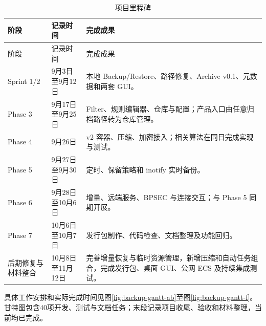 \begin{longtable}{L{.22\linewidth}L{.23\linewidth}L{.44\linewidth}}
\caption{项目里程碑}\label{tab:milestones}\\\toprule 阶段 & 记录时间 & 完成成果\\\midrule\endfirsthead
\toprule 阶段 & 记录时间 & 完成成果\\\midrule\endhead
Sprint 1/2 & 9月3日至9月12日 & 本地 Backup/Restore、路径修复、Archive v0.1、元数据和两套 GUI。\\
Phase 3 & 9月17日至9月25日 & Filter、规则编辑器、仓库与配置；产品入口由任意归档路径转为仓库管理。\\
Phase 4 & 9月26日 & v2 容器、压缩、加密接入；相关算法在同日完成实现与测试。\\
Phase 5 & 9月27日至9月30日 & 定时、保留策略和 inotify 实时备份。\\
Phase 6 & 9月28日至10月6日 & 增量、远端服务、BPSEC 与连接交互；与 Phase 5 同期开展。\\
Phase 7 & 10月6日至10月7日 & 发行包制作、代码检查、文档整理及功能回归。\\
后期修复与材料整合 & 10月8日至11月12日 & 完善增量恢复与临时资源管理，新增压缩和自动任务组合，完成发行包、桌面 GUI、公网 ECS 及持续集成测试。\\
\bottomrule\end{longtable}
具体工作安排和实际完成时间见图\ref{fig:backup-gantt-ab}至图\ref{fig:backup-gantt-f}。甘特图包含40项开发、测试与文档任务；末段记录项目收尾、验收和材料整理，当前均已完成。

